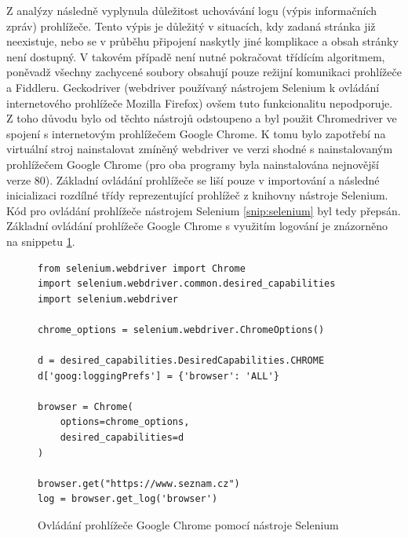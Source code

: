 \documentclass[thesis=M,czech,hidelinks]{FITthesis}[2013/05/06]
\begin{document}
Z analýzy následně vyplynula důležitost uchovávání logu (výpis informačních zpráv) prohlížeče. Tento výpis je důležitý v situacích, kdy zadaná stránka již neexistuje, nebo se v průběhu připojení naskytly jiné komplikace a obsah stránky není dostupný. V takovém případě není nutné pokračovat třídícím algoritmem, poněvadž všechny zachycené soubory obsahují pouze režijní komunikaci prohlížeče a Fiddleru. Geckodriver (webdriver používaný nástrojem Selenium k ovládání internetového prohlížeče Mozilla Firefox) ovšem tuto funkcionalitu nepodporuje. Z toho důvodu bylo od těchto nástrojů odstoupeno a byl použit Chromedriver ve spojení s internetovým prohlížečem Google Chrome. K tomu bylo zapotřebí na virtuální stroj nainstalovat zmíněný webdriver ve verzi shodné s nainstalovaným prohlížečem Google Chrome (pro oba programy byla nainstalována nejnovější verze 80). Základní ovládání prohlížeče se liší pouze v importování a následné inicializaci rozdílné třídy reprezentující prohlížeč z knihovny nástroje Selenium. Kód pro ovládání prohlížeče nástrojem Selenium \ref{snip:selenium} byl tedy přepsán. Základní ovládání prohlížeče Google Chrome s využitím logování je znázorněno na snippetu \ref{snip:selenium_new}.

\begin{figure}[h]               
	\begin{verbatim}
from selenium.webdriver import Chrome
import selenium.webdriver.common.desired_capabilities
import selenium.webdriver

chrome_options = selenium.webdriver.ChromeOptions()

d = desired_capabilities.DesiredCapabilities.CHROME
d['goog:loggingPrefs'] = {'browser': 'ALL'}

browser = Chrome(
    options=chrome_options, 
    desired_capabilities=d
)

browser.get("https://www.seznam.cz")
log = browser.get_log('browser')
	\end{verbatim}      
	\caption{Ovládání prohlížeče Google Chrome pomocí nástroje Selenium}
	\label{snip:selenium_new}
\end{figure}
\end{document}

